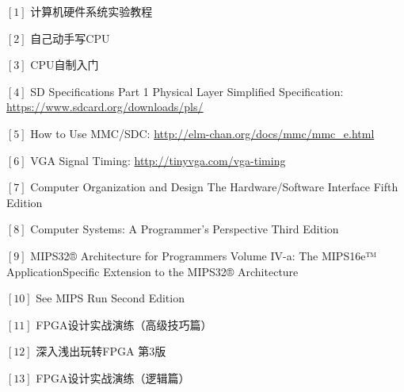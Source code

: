 \documentclass[11pt,utf8]{report}
\begin{document}
$[1] $ 计算机硬件系统实验教程

$[2] $ 自己动手写CPU

$[3] $ CPU自制入门

$[4] $ SD Specifications Part 1 Physical Layer Simplified Specification: \url{https://www.sdcard.org/downloads/pls/}

$[5] $ How to Use MMC/SDC: \url{http://elm-chan.org/docs/mmc/mmc\_e.html}

$[6] $ VGA Signal Timing: \url{http://tinyvga.com/vga-timing}

$[7] $ Computer Organization and Design The Hardware/Software Interface Fifth Edition

$[8] $ Computer Systems: A Programmer's Perspective Third Edition

$[9] $ MIPS32® Architecture for Programmers Volume IV-a: The MIPS16e™ ApplicationSpecific Extension to the MIPS32® Architecture

$[10]$ See MIPS Run Second Edition

$[11]$  FPGA设计实战演练（高级技巧篇）

$[12]$  深入浅出玩转FPGA 第3版

$[13]$  FPGA设计实战演练（逻辑篇）
\end{document}
